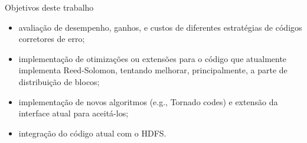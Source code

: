   \begin{frame}{Objetivos deste trabalho}

  \begin{itemize}
     \item avaliação de desempenho, ganhos, e custos de diferentes
  estratégias de códigos corretores de erro;
     \item implementação de otimizações ou extensões para o código que
  atualmente implementa Reed-Solomon, tentando melhorar,
  principalmente, a parte de distribuição de blocos;
     \item implementação de novos algoritmos (e.g., Tornado codes) e
  extensão da interface atual para aceitá-los;
     \item integração do código atual com o HDFS.
     \end{itemize}
  \end{frame}
